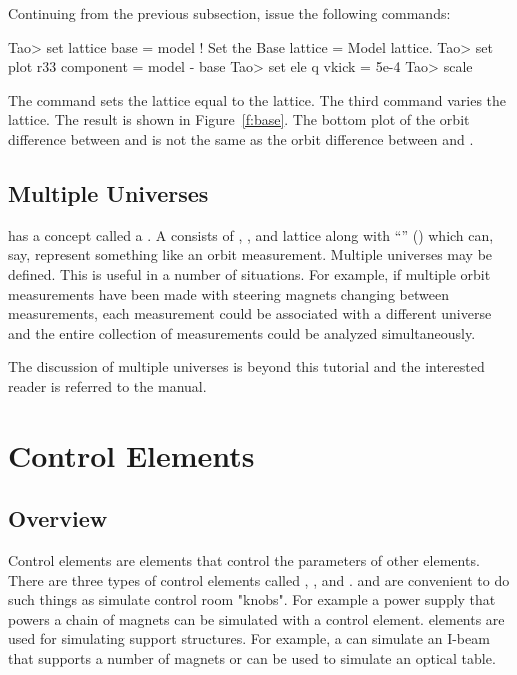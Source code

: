 \documentclass{hitec}
\newcommand{\Section}[1]{\section{#1}\vspace*{-1ex}}
\begin{document}
Continuing from the previous subsection, issue the following commands:
\begin{code}
Tao> set lattice base = model  ! Set the Base lattice = Model lattice.
Tao> set plot r33 component = model - base
Tao> set ele q vkick = 5e-4
Tao> scale
\end{code} 
The  command sets the  lattice equal to the 
lattice. The third command varies the  lattice.  The result is shown in
Figure~\ref{f:base}. The bottom plot of the orbit difference between  and
 is not the same as the orbit difference between  and .

\subsection{Multiple Universes}
\label{s:mult.uni}

\tao has a concept called a . A  consists of , ,
and  lattice along with ``'' () which can, say, represent something like
an orbit measurement. Multiple universes may be defined. This is useful in a number of 
situations. For example, if multiple orbit measurements have been made with steering magnets
changing between measurements, each measurement could be associated with a different universe
and the entire collection of measurements could be analyzed simultaneously. 

The discussion of multiple universes is beyond this tutorial and the interested reader is 
referred to the \tao manual.


\Section{Control Elements}

\subsection{Overview}

Control elements are elements that control the parameters of other elements. There are three types
of control elements called , , and .  and
 are convenient to do such things as simulate control room "knobs". For example a power
supply that powers a chain of magnets can be simulated with a control element.   elements
are used for simulating support structures. For example, a  can simulate an I-beam that
supports a number of magnets or can be used to simulate an optical table.
\end{document}

